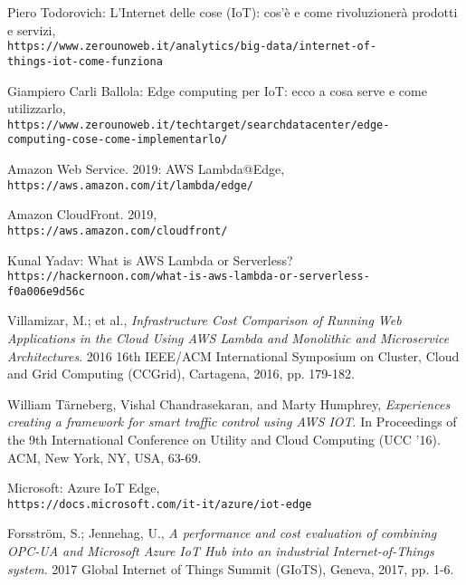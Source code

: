 \documentclass[a4paper,12pt,oneside]{book}
\begin{document}
\begin{thebibliography}{9}
	
	Piero Todorovich: L’Internet delle cose (IoT): cos’è e come rivoluzionerà prodotti e servizi,
	\\\texttt{https://www.zerounoweb.it/analytics/big-data/internet-of-\\things-iot-come-funziona}
	
	Giampiero Carli Ballola: Edge computing per IoT: ecco a cosa serve e come utilizzarlo,
	\\\texttt{https://www.zerounoweb.it/techtarget/searchdatacenter/edge-\\computing-cose-come-implementarlo/}
		
	Amazon Web Service. 2019: AWS Lambda@Edge,
	\\\texttt{https://aws.amazon.com/it/lambda/edge/}
	
	Amazon CloudFront. 2019,
	\\\texttt{https://aws.amazon.com/cloudfront/}
	
	Kunal Yadav: What is AWS Lambda or Serverless?
	\\\texttt{https://hackernoon.com/what-is-aws-lambda-or-serverless-\\f0a006e9d56c}

	
	Villamizar, M.; et al., 
	\textit{Infrastructure Cost Comparison of Running Web Applications in the Cloud Using AWS Lambda and Monolithic and Microservice Architectures}. 
	2016 16th IEEE/ACM International Symposium on Cluster, Cloud and Grid Computing (CCGrid), Cartagena, 2016, pp. 179-182.
	
	William Tärneberg, Vishal Chandrasekaran, and Marty Humphrey, 
	\textit{Experiences creating a framework for smart traffic control using AWS IOT}. 
	In Proceedings of the 9th International Conference on Utility and Cloud Computing (UCC '16). ACM, New York, NY, USA, 63-69.
	
	Microsoft: Azure IoT Edge,
	\\\texttt{https://docs.microsoft.com/it-it/azure/iot-edge}
	
	Forsström, S.; Jennehag, U., 
	\textit{A performance and cost evaluation of combining OPC-UA and Microsoft Azure IoT Hub into an industrial Internet-of-Things system}. 
	2017 Global Internet of Things Summit (GIoTS), Geneva, 2017, pp. 1-6.
	

\end{thebibliography}
\end{document}
